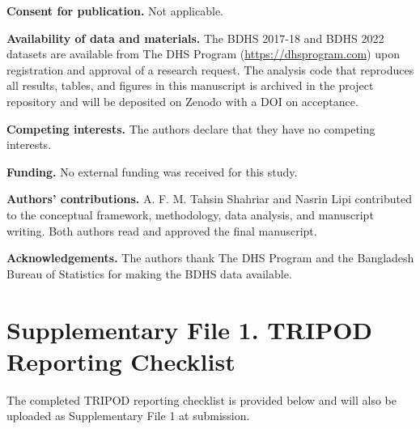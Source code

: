 \documentclass[
  12pt,
  a4paper]{article}
\begin{document}
\textbf{Consent for publication.} Not applicable.

\textbf{Availability of data and materials.} The BDHS 2017-18 and BDHS 2022 datasets are available from The DHS Program (\url{https://dhsprogram.com}) upon registration and approval of a research request. The analysis code that reproduces all results, tables, and figures in this manuscript is archived in the project repository and will be deposited on Zenodo with a DOI on acceptance.

\textbf{Competing interests.} The authors declare that they have no competing interests.

\textbf{Funding.} No external funding was received for this study.

\textbf{Authors' contributions.} A. F. M. Tahsin Shahriar and Nasrin Lipi contributed to the conceptual framework, methodology, data analysis, and manuscript writing. Both authors read and approved the final manuscript.

\textbf{Acknowledgements.} The authors thank The DHS Program and the Bangladesh Bureau of Statistics for making the BDHS data available.



\newpage

\section*{Supplementary File 1. TRIPOD Reporting Checklist}\label{supplementary-file-1.-tripod-reporting-checklist}

The completed TRIPOD reporting checklist \citep{moons_tripod_2015} is provided below and will also be uploaded as Supplementary File 1 at submission.
\end{document}
